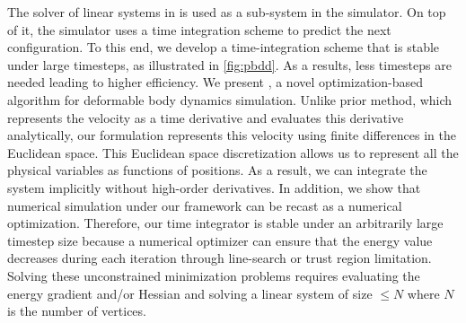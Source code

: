 The solver of linear systems in  is used as a sub-system in the simulator. On top of it, the simulator uses a time integration scheme to predict the next configuration. To this end, we develop a time-integration scheme that is stable under large timesteps, as illustrated in \autoref{fig:pbdd}. As a results, less timesteps are needed leading to higher efficiency.  We present , a novel optimization-based algorithm for deformable body dynamics simulation. Unlike prior method, which represents the velocity as a time derivative and evaluates this derivative analytically, our  formulation represents this velocity using finite differences in the Euclidean space. This Euclidean space discretization allows us to represent all the physical variables as functions of positions. As a result, we can integrate the system implicitly without high-order derivatives. In addition, we show that numerical simulation under our  framework can be recast as a numerical optimization. Therefore, our time integrator is stable under an arbitrarily large timestep size because a numerical optimizer can ensure that the energy value decreases during each iteration through line-search or trust region limitation. Solving these unconstrained minimization problems requires evaluating the energy gradient and/or Hessian and solving a linear system of size $\leq N$ where $N$ is the number of vertices.

